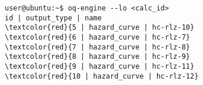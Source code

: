 \begin{Verbatim}[frame=single, commandchars=\\\{\}, fontsize=\small]
user@ubuntu:~$ oq-engine --lo <calc_id>
id | output_type | name
\textcolor{red}{5 | hazard_curve | hc-rlz-10}
\textcolor{red}{6 | hazard_curve | hc-rlz-7}
\textcolor{red}{7 | hazard_curve | hc-rlz-8}
\textcolor{red}{8 | hazard_curve | hc-rlz-9}
\textcolor{red}{9 | hazard_curve | hc-rlz-11}
\textcolor{red}{10 | hazard_curve | hc-rlz-12}
\end{Verbatim}